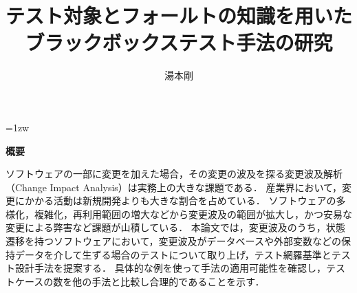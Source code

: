 \documentclass[a4paper,12pt]{jreport}
\title{テスト対象とフォールトの知識を用いたブラックボックステスト手法の研究}
\author{湯本剛}
\begin{document}

\maketitle
\thispagestyle{empty}
\newpage

\thispagestyle{empty}
\vspace*{20pt plus 1fil}
\parindent=1zw
\noindent
\begin{center}
{\bf 概要}
\vspace{5mm}
\end{center}
ソフトウェアの一部に変更を加えた場合，その変更の波及を探る変更波及解析（Change Impact Analysis）は実務上の大きな課題である．
産業界において，変更にかかる活動は新規開発よりも大きな割合を占めている．
ソフトウェアの多様化，複雑化，再利用範囲の増大などから変更波及の範囲が拡大し，かつ安易な変更による弊害など課題が山積している．
本論文では，変更波及のうち，状態遷移を持つソフトウェアにおいて，変更波及がデータベースや外部変数などの保持データを介して生ずる場合のテストについて取り上げ，テスト網羅基準とテスト設計手法を提案する．
具体的な例を使って手法の適用可能性を確認し，テストケースの数を他の手法と比較し合理的であることを示す．
\par
\vspace{0pt plus 1fil}
\newpage

\tableofcontents
\listoffigures

\pagebreak \setcounter{page}{1}

\end{document}
